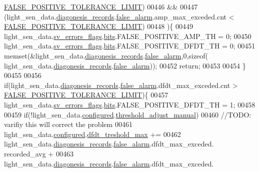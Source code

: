 \begin{DoxyCode}
      \hyperlink{a00024_aa88a423475bb5b13601785eed80fb1b9}{FALSE\_POSITIVE\_TOLERANCE\_LIMIT})
00446           &&
00447      (light\_sen\_data.\hyperlink{a00024_a7ae905b560513ad201e58c2f63375030}{diagonesis\_records}.\hyperlink{a00017_a799f50625c0c03f9404a59287810113d}{false\_alarm}.amp\_max\_exceded.cnt < 
      \hyperlink{a00024_aa88a423475bb5b13601785eed80fb1b9}{FALSE\_POSITIVE\_TOLERANCE\_LIMIT})
00448      )\{
00449       light\_sen\_data.\hyperlink{a00024_aaeec6b0609dba31393f337abf1cce3d3}{sv\_errors\_flags}.\hyperlink{a00022_ab81eb6fb4f1351ed07b4d6c4dd6f1959}{bits}.FALSE\_POSITIVE\_AMP\_TH  = 0;
00450       light\_sen\_data.\hyperlink{a00024_aaeec6b0609dba31393f337abf1cce3d3}{sv\_errors\_flags}.\hyperlink{a00022_ab81eb6fb4f1351ed07b4d6c4dd6f1959}{bits}.FALSE\_POSITIVE\_DFDT\_TH = 0;
00451       memset(&light\_sen\_data.\hyperlink{a00024_a7ae905b560513ad201e58c2f63375030}{diagonesis\_records}.\hyperlink{a00017_a799f50625c0c03f9404a59287810113d}{false\_alarm},0,\textcolor{keyword}{sizeof}(
      light\_sen\_data.\hyperlink{a00024_a7ae905b560513ad201e58c2f63375030}{diagonesis\_records}.\hyperlink{a00017_a799f50625c0c03f9404a59287810113d}{false\_alarm}));
00452       \textcolor{keywordflow}{return};
00453 
00454     \}
00455 
00456       \textcolor{keywordflow}{if}(light\_sen\_data.\hyperlink{a00024_a7ae905b560513ad201e58c2f63375030}{diagonesis\_records}.\hyperlink{a00017_a799f50625c0c03f9404a59287810113d}{false\_alarm}.dfdt\_max\_exceded.cnt > 
      \hyperlink{a00024_aa88a423475bb5b13601785eed80fb1b9}{FALSE\_POSITIVE\_TOLERANCE\_LIMIT})\{
00457           light\_sen\_data.\hyperlink{a00024_aaeec6b0609dba31393f337abf1cce3d3}{sv\_errors\_flags}.\hyperlink{a00022_ab81eb6fb4f1351ed07b4d6c4dd6f1959}{bits}.FALSE\_POSITIVE\_DFDT\_TH = 1;
00458 
00459          \textcolor{keywordflow}{if}(!light\_sen\_data.\hyperlink{a00024_a94b2d1f6ea4ab334c74d24984dd27843}{configured}.\hyperlink{a00021_a18e270a10094f045f20299b0f7e83085}{threshold\_adjust\_manual})
00460           \textcolor{comment}{//TODO: varifiy this will correct the problem}
00461           light\_sen\_data.\hyperlink{a00024_a94b2d1f6ea4ab334c74d24984dd27843}{configured}.\hyperlink{a00021_adf9a37828e447378b1d533185213316d}{dfdt\_treshold\_max} +=
00462           light\_sen\_data.\hyperlink{a00024_a7ae905b560513ad201e58c2f63375030}{diagonesis\_records}.\hyperlink{a00017_a799f50625c0c03f9404a59287810113d}{false\_alarm}.dfdt\_max\_exceded.
      recorded\_avg +
00463           light\_sen\_data.\hyperlink{a00024_a7ae905b560513ad201e58c2f63375030}{diagonesis\_records}.\hyperlink{a00017_a799f50625c0c03f9404a59287810113d}{false\_alarm}.dfdt\_max\_exceded.

\end{DoxyCode}
